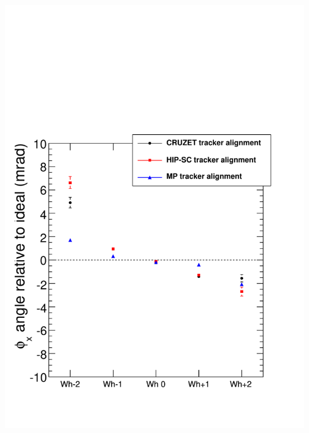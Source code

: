 \documentclass[compress]{beamer}
\begin{document}
\begin{frame}
{\begin{columns}
\includegraphics[width=\linewidth]{compare_tracker_alignment_phix.pdf}

\end{columns}}
\end{frame}
\end{document}
